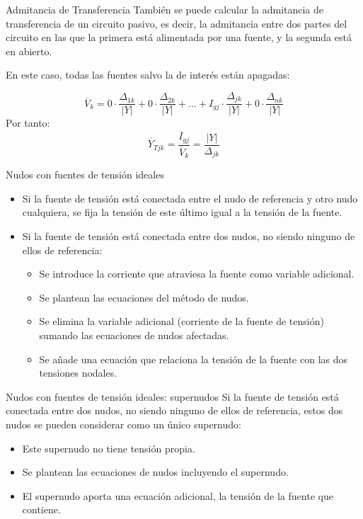 \documentclass[aspectratio=169, usenames,svgnames,dvipsnames]{beamer}
\begin{document}
\begin{frame}[label={sec:orgb59b965}]{Admitancia de Transferencia}
También se puede calcular la admitancia de transferencia de un circuito pasivo, es decir, la admitancia entre dos partes del circuito en las que la primera está alimentada por una fuente, y la segunda está en abierto.

En este caso, todas las fuentes salvo la de interés están apagadas:

\[
  \overline{V}_k = 0 \cdot \frac{\Delta_{1k}}{|Y|} + 0 \cdot \frac{\Delta_{2k}}{|Y|} + \dots + I_{gj} \cdot \frac{\Delta_{jk}}{|Y|} + 0 \cdot \frac{\Delta_{nk}}{|Y|}
\]
Por tanto:
\[
  \boxed{\overline{Y}_{Tjk} = \frac{\overline{I}_{gj}}{\overline{V}_k}=  \frac{|Y|}{\Delta_{jk}}}
\]
\end{frame}


\begin{frame}[label={sec:org234862b}]{Nudos con fuentes de tensión ideales}
\begin{itemize}
\item Si la fuente de tensión está conectada entre el nudo de referencia y otro nudo cualquiera, se fija la tensión de este último igual a la tensión de la fuente.
\item Si la fuente de tensión está conectada entre dos nudos, no siendo ninguno de ellos de referencia:
\begin{itemize}
\item Se introduce la corriente que atraviesa la fuente como variable adicional.
\item Se plantean las ecuaciones del método de nudos.
\item Se elimina la variable adicional (corriente de la fuente de tensión) sumando las ecuaciones de nudos afectadas.
\item Se añade una ecuación que relaciona la tensión de la fuente con las dos tensiones nodales.
\end{itemize}
\end{itemize}
\end{frame}

\begin{frame}[label={sec:org51f64e4}]{Nudos con fuentes de tensión ideales: supernudos}
Si la fuente de tensión está conectada entre dos nudos, no siendo ninguno de ellos de referencia, estos dos nudos se pueden considerar como un único supernudo:
\begin{itemize}
\item Este supernudo no tiene tensión propia.
\item Se plantean las ecuaciones de nudos incluyendo el supernudo.
\item El supernudo aporta una ecuación adicional, la tensión de la fuente que contiene.
\end{itemize}
\end{frame}
\end{document}
